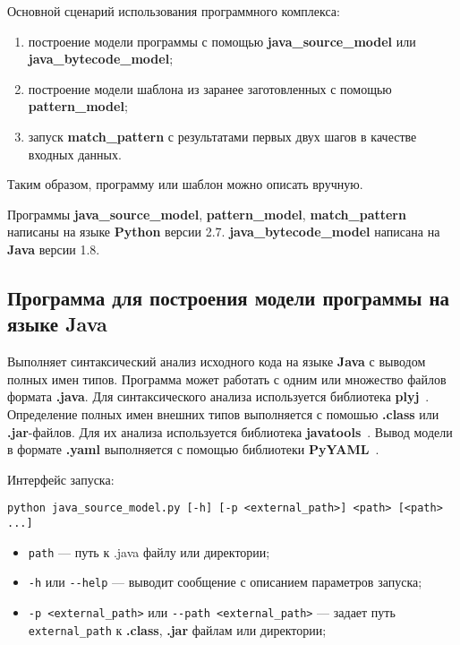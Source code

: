 Основной сценарий использования программного комплекса:
\begin{enumerate}
\item построение модели программы с помощью \textbf{java\_source\_model} или \textbf{java\_bytecode\_model};
\item построение модели шаблона из заранее заготовленных с помощью \textbf{pattern\_model};
\item запуск \textbf{match\_pattern} с результатами первых двух шагов в качестве входных данных.
\end{enumerate}

Таким образом, программу или шаблон можно описать вручную.

Программы \textbf{java\_source\_model}, \textbf{pattern\_model},
\textbf{match\_pattern} написаны на языке \textbf{Python} версии 2.7.
\textbf{java\_bytecode\_model} написана на \textbf{Java} версии 1.8.

\subsection{Программа для построения модели программы на языке Java}

Выполняет синтаксический анализ исходного кода на языке \textbf{Java} с выводом
полных имен типов.
Программа может работать с одним или множество файлов формата \textbf{.java}.
Для синтаксического анализа используется библиотека \textbf{plyj}~\cite{plyj}.
Определение полных имен внешних типов выполняется с помошью \textbf{.class} или
\textbf{.jar}-файлов.
Для их анализа используется библиотека \textbf{javatools}~\cite{javatools}.
Вывод модели в формате \textbf{.yaml} выполняется с помощью библиотеки
\textbf{PyYAML}~\cite{PyYAML}.

Интерфейс запуска:
\begin{verbatim}
python java_source_model.py [-h] [-p <external_path>] <path> [<path> ...]
\end{verbatim}

\begin{itemize}
\item \verb;path; --- путь к .java файлу или директории;
\item \verb;-h; или \verb;--help; --- выводит сообщение с описанием параметров
запуска;
\item \verb;-p <external_path>; или \verb;--path <external_path>; --- задает
путь \verb;external_path; к \textbf{.class}, \textbf{.jar} файлам или директории;
\end{itemize}

